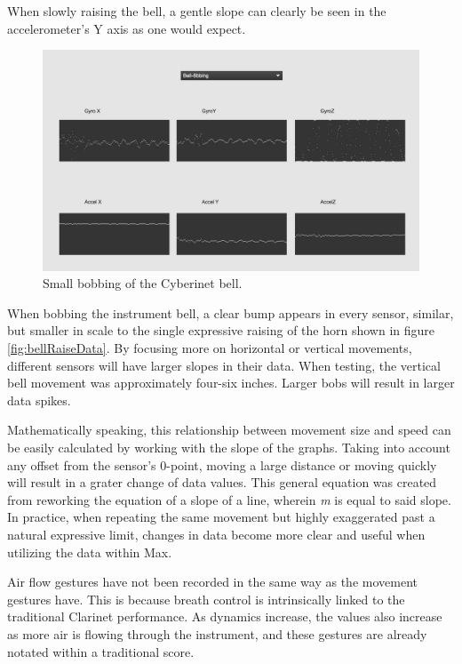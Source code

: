When slowly raising the bell, a gentle slope can clearly be seen in the accelerometer's Y axis as one would expect. 

\begin{figure}
    \centering
    \includegraphics[scale=0.25]{diagrams/gestureData/bellBob.png}
    \caption{Small bobbing of the Cyberinet bell.}
    \label{fig:bellBobData}
\end{figure}

When bobbing the instrument bell, a clear bump appears in every sensor, similar, but smaller in scale to the single expressive raising of the horn shown in figure \ref{fig:bellRaiseData}. By focusing more on horizontal or vertical movements, different sensors will have larger slopes in their data. When testing, the vertical bell movement was approximately four-six inches. Larger bobs will result in larger data spikes.

Mathematically speaking, this relationship between movement size and speed can be easily calculated by working with the slope of the graphs. Taking into account any offset from the sensor's 0-point, moving a large distance or moving quickly will result in a grater change of data values. This general equation was created from reworking the equation of a slope of a line, wherein \textit{m} is equal to said slope. In practice, when repeating the same movement but highly exaggerated past a natural expressive limit, changes in data become more clear and useful when utilizing the data within Max. 

Air flow gestures have not been recorded in the same way as the movement gestures have. This is because breath control is intrinsically linked to the traditional Clarinet performance. As dynamics increase, the values also increase as more air is flowing through the instrument, and these gestures are already notated within a traditional score. 

